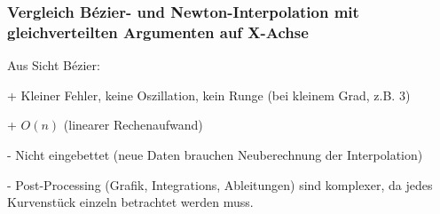 \subsubsection{Vergleich Bézier- und Newton-Interpolation mit gleichverteilten Argumenten auf X-Achse}
  Aus Sicht Bézier:
  \begin{liste}
    \item[+] Kleiner Fehler, keine Oszillation, kein Runge (bei kleinem Grad, z.B. 3)
    \item[+] $O(n)$ (linearer Rechenaufwand)
    \item[-] Nicht eingebettet (neue Daten brauchen Neuberechnung der Interpolation)
    \item[-] Post-Processing (Grafik, Integrations, Ableitungen) sind komplexer, da jedes Kurvenstück
      einzeln betrachtet werden muss.
  \end{liste}
